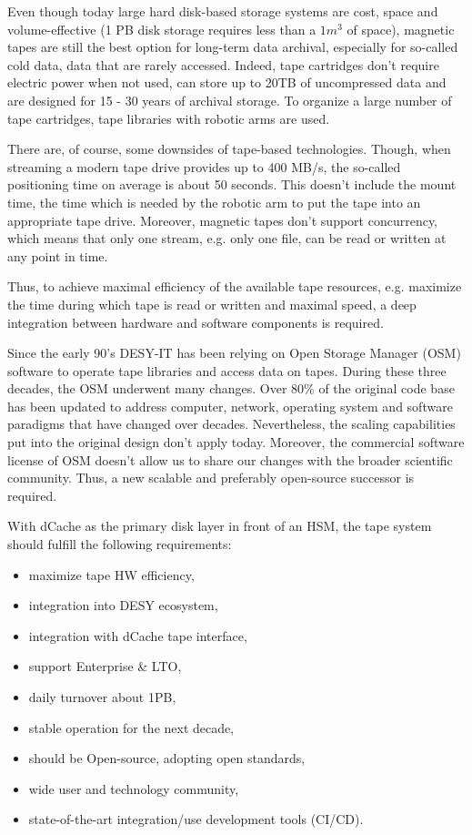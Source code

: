 \documentclass{webofc}
\begin{document}
Even though today large hard disk-based storage systems are cost, space and volume-effective (1 PB disk storage requires less than a ${1m^{3}}$ of space),
magnetic tapes are still the best option for long-term data archival, especially for so-called cold data, data that are rarely accessed.
Indeed, tape cartridges don't require electric power when not used, can store up to 20TB of uncompressed data and are designed for
15 - 30 years of archival storage. To organize a large number of tape cartridges, tape libraries with robotic arms are used.

There are, of course, some downsides of tape-based technologies. Though, when streaming a modern tape drive provides up to 400 MB/s,
the so-called positioning time on average is about 50 seconds. This doesn't include the mount time, the time which is needed by the
robotic arm to put the tape into an appropriate tape drive. Moreover, magnetic tapes don't support concurrency, which means that only
one stream, e.g. only one file, can be read or written at any point in time.

Thus, to achieve maximal efficiency of the available tape resources, e.g. maximize the time during which tape is read or written and
maximal speed, a deep integration between hardware and software components is required.

Since the early 90's DESY-IT has been relying on Open Storage Manager (OSM) software to operate tape libraries and access data on tapes\cite{osm_desy}.
During these three decades, the OSM underwent many changes. Over 80\% of the original code base has been updated to address computer, network,
operating system and software paradigms that have changed over decades. Nevertheless, the scaling capabilities put into the original design
don't apply today. Moreover, the commercial software license of OSM doesn't allow us to share our changes with the broader scientific community.
Thus, a new scalable and preferably open-source successor is required.

With dCache as the primary disk layer in front of an HSM, the tape system should fulfill the following requirements:

\begin{itemize}
    \item maximize tape HW efficiency,
    \item integration into DESY ecosystem,
    \item integration with dCache tape interface,
    \item support Enterprise \& LTO,
    \item daily turnover about 1PB,
    \item stable operation for the next decade,
    \item should be Open-source, adopting open standards,
    \item wide user and technology community,
    \item state-of-the-art integration/use development tools (CI/CD).
\end{itemize}
\end{document}
